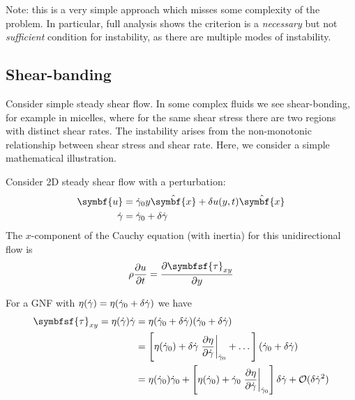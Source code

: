 \documentclass{jknotes}
\begin{document}
Note: this is a very simple approach which misses some complexity of the
problem. In particular, full analysis shows the criterion is a \emph{necessary}
but not \emph{sufficient} condition for instability, as there are multiple
modes of instability.

\subsection{Shear-banding}
Consider simple steady shear flow. In some complex fluids we see
shear-bonding, for example in micelles, where for the same shear stress there
are two regions with distinct shear rates. The instability arises from the
non-monotonic relationship between shear stress and shear rate. Here, we
consider a simple mathematical illustration.

\begin{center}
\end{center}

Consider 2D steady shear flow with a perturbation:
\begin{align}
	\symbf{u} &= \srate_0 y \hat{\symbf{x}} + \delta u(y,t) \hat{\symbf{x}} \\
	\srate &= \srate_0 + \delta \srate \\
\end{align}
The $x$-component of the Cauchy equation (with inertia) for this
unidirectional flow is
\begin{equation}
	\rho \frac{\partial u}{\partial t} = \frac{\partial
	\symbfsf{\tau}_{xy}}{\partial y}
\end{equation}

For a GNF with $\eta(\dot{\gamma}) = \eta(\dot{\gamma}_0 + \delta \dot{\gamma})$ we have
\begin{align}
	\symbfsf{\tau}_{xy} = \eta(\srate) \srate &= \eta(\srate_0 +
	\delta\srate)(\srate_0 + \delta\srate) \\
	&= \left[ \eta(\srate_0) + \delta \srate \left.\frac{\partial \eta}{\partial
	\srate}\right|_{\srate_0} + \dots \right](\srate_0+\delta\srate) \\
	&= \eta(\srate_0)\srate_0 + \left[ \eta(\srate_0) +
	\srate_0\left.\frac{\partial \eta}{\partial
	\srate}\right|_{\srate_0}\right] \delta \srate + \mathcal{O}(\delta
	\srate^2)
\end{align}
\end{document}
